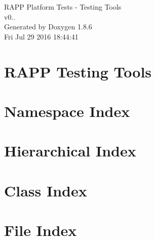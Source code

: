 \documentclass[twoside]{book}
\newcommand{\clearemptydoublepage}{%
  \newpage{\pagestyle{empty}\cleardoublepage}%
}
\begin{document}
\hypersetup{pageanchor=false}
\begin{titlepage}
\vspace*{7cm}
\begin{center}%
{\Large R\-A\-P\-P Platform Tests -\/ Testing Tools \\[1ex]\large v0.. }\\
\vspace*{1cm}
{\large Generated by Doxygen 1.8.6}\\
\vspace*{0.5cm}
{\small Fri Jul 29 2016 18:44:41}\\
\end{center}
\end{titlepage}
\clearemptydoublepage
\tableofcontents
\clearemptydoublepage
{}
\hypersetup{pageanchor=true}

\chapter{R\-A\-P\-P Testing Tools}
\label{md__home_travis_rapp_temp_rapp-platform_rapp_testing_tools_README}
\hypertarget{md__home_travis_rapp_temp_rapp-platform_rapp_testing_tools_README}{}

\chapter{Namespace Index}

\chapter{Hierarchical Index}

\chapter{Class Index}

\chapter{File Index}

\end{document}
